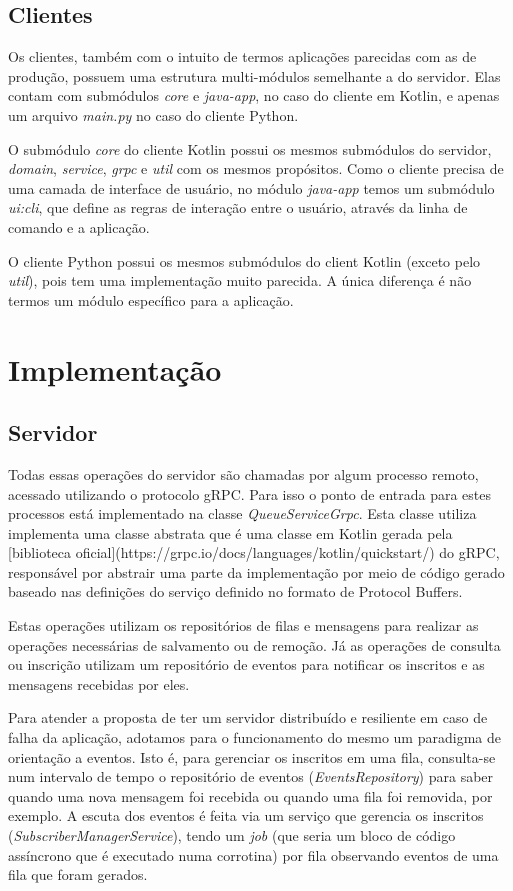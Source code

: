 \documentclass{article}
\begin{document}
\subsection{Clientes}

Os clientes, também com o intuito de termos aplicações parecidas com as de produção, possuem uma estrutura 
multi-módulos semelhante a do servidor. Elas contam com submódulos \textit{core} e \textit{java-app}, no caso do cliente em Kotlin, e
apenas um arquivo \textit{main.py} no caso do cliente Python.

O submódulo \textit{core} do cliente Kotlin possui os mesmos submódulos do servidor, \textit{domain}, \textit{service}, \textit{grpc} e \textit{util}
com os mesmos propósitos. Como o cliente precisa de uma camada de interface de usuário, no módulo \textit{java-app} temos
um submódulo \textit{ui:cli}, que define as regras de interação entre o usuário, através da linha de comando e a
aplicação.

O cliente Python possui os mesmos submódulos do client Kotlin (exceto pelo \textit{util}), pois tem uma implementação muito
parecida. A única diferença é não termos um módulo específico para a aplicação.

\section{Implementação}

\subsection{Servidor}

Todas essas operações do servidor são chamadas por algum processo remoto, acessado utilizando o protocolo gRPC. 
Para isso o ponto de entrada para estes processos está implementado na classe \textit{QueueServiceGrpc}. Esta classe utiliza
implementa uma classe abstrata que é uma classe em Kotlin gerada pela
[biblioteca oficial](https://grpc.io/docs/languages/kotlin/quickstart/) do gRPC, responsável por abstrair
uma parte da implementação por meio de código gerado baseado nas definições do serviço definido no formato  
de Protocol Buffers.

Estas operações utilizam os repositórios de filas e mensagens para realizar as operações necessárias de salvamento
ou de remoção. Já as operações de consulta ou inscrição utilizam um repositório de eventos para notificar os inscritos
e as mensagens recebidas por eles.

Para atender a proposta de ter um servidor distribuído e resiliente em caso de falha da aplicação,
adotamos para o funcionamento do mesmo um paradigma de orientação a eventos. Isto é, 
para gerenciar os inscritos em uma fila, consulta-se num intervalo de tempo o repositório de eventos (\textit{EventsRepository})
para saber quando uma nova mensagem foi recebida ou quando uma fila foi removida, por exemplo. A escuta dos eventos
é feita via um serviço que gerencia os inscritos (\textit{SubscriberManagerService}),
tendo um \textit{job} (que seria um bloco de código assíncrono que é executado numa corrotina) por fila
observando eventos de uma fila que foram gerados.
\end{document}
